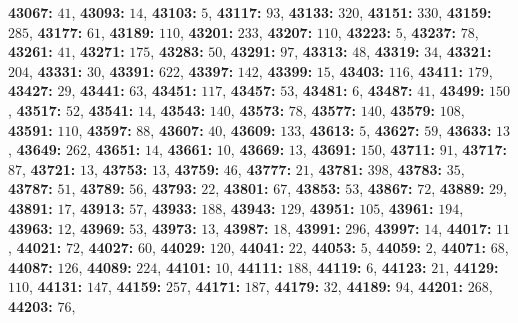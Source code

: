 \textsf{\bfseries 43067:} $41$, \textsf{\bfseries 43093:} $14$, \textsf{\bfseries 43103:} $5$, \textsf{\bfseries 43117:} $93$, \textsf{\bfseries 43133:} $320$, \textsf{\bfseries 43151:} $330$, \textsf{\bfseries 43159:} $285$, \textsf{\bfseries 43177:} $61$, \textsf{\bfseries 43189:} $110$, \textsf{\bfseries 43201:} $233$, \textsf{\bfseries 43207:} $110$, \textsf{\bfseries 43223:} $5$, \textsf{\bfseries 43237:} $78$, \textsf{\bfseries 43261:} $41$, \textsf{\bfseries 43271:} $175$, \textsf{\bfseries 43283:} $50$, \textsf{\bfseries 43291:} $97$, \textsf{\bfseries 43313:} $48$, \textsf{\bfseries 43319:} $34$, \textsf{\bfseries 43321:} $204$, \textsf{\bfseries 43331:} $30$, \textsf{\bfseries 43391:} $622$, \textsf{\bfseries 43397:} $142$, \textsf{\bfseries 43399:} $15$, \textsf{\bfseries 43403:} $116$, \textsf{\bfseries 43411:} $179$, \textsf{\bfseries 43427:} $29$, \textsf{\bfseries 43441:} $63$, \textsf{\bfseries 43451:} $117$, \textsf{\bfseries 43457:} $53$, \textsf{\bfseries 43481:} $6$, \textsf{\bfseries 43487:} $41$, \textsf{\bfseries 43499:} $150$, \textsf{\bfseries 43517:} $52$, \textsf{\bfseries 43541:} $14$, \textsf{\bfseries 43543:} $140$, \textsf{\bfseries 43573:} $78$, \textsf{\bfseries 43577:} $140$, \textsf{\bfseries 43579:} $108$, \textsf{\bfseries 43591:} $110$, \textsf{\bfseries 43597:} $88$, \textsf{\bfseries 43607:} $40$, \textsf{\bfseries 43609:} $133$, \textsf{\bfseries 43613:} $5$, \textsf{\bfseries 43627:} $59$, \textsf{\bfseries 43633:} $13$, \textsf{\bfseries 43649:} $262$, \textsf{\bfseries 43651:} $14$, \textsf{\bfseries 43661:} $10$, \textsf{\bfseries 43669:} $13$, \textsf{\bfseries 43691:} $150$, \textsf{\bfseries 43711:} $91$, \textsf{\bfseries 43717:} $87$, \textsf{\bfseries 43721:} $13$, \textsf{\bfseries 43753:} $13$, \textsf{\bfseries 43759:} $46$, \textsf{\bfseries 43777:} $21$, \textsf{\bfseries 43781:} $398$, \textsf{\bfseries 43783:} $35$, \textsf{\bfseries 43787:} $51$, \textsf{\bfseries 43789:} $56$, \textsf{\bfseries 43793:} $22$, \textsf{\bfseries 43801:} $67$, \textsf{\bfseries 43853:} $53$, \textsf{\bfseries 43867:} $72$, \textsf{\bfseries 43889:} $29$, \textsf{\bfseries 43891:} $17$, \textsf{\bfseries 43913:} $57$, \textsf{\bfseries 43933:} $188$, \textsf{\bfseries 43943:} $129$, \textsf{\bfseries 43951:} $105$, \textsf{\bfseries 43961:} $194$, \textsf{\bfseries 43963:} $12$, \textsf{\bfseries 43969:} $53$, \textsf{\bfseries 43973:} $13$, \textsf{\bfseries 43987:} $18$, \textsf{\bfseries 43991:} $296$, \textsf{\bfseries 43997:} $14$, \textsf{\bfseries 44017:} $11$, \textsf{\bfseries 44021:} $72$, \textsf{\bfseries 44027:} $60$, \textsf{\bfseries 44029:} $120$, \textsf{\bfseries 44041:} $22$, \textsf{\bfseries 44053:} $5$, \textsf{\bfseries 44059:} $2$, \textsf{\bfseries 44071:} $68$, \textsf{\bfseries 44087:} $126$, \textsf{\bfseries 44089:} $224$, \textsf{\bfseries 44101:} $10$, \textsf{\bfseries 44111:} $188$, \textsf{\bfseries 44119:} $6$, \textsf{\bfseries 44123:} $21$, \textsf{\bfseries 44129:} $110$, \textsf{\bfseries 44131:} $147$, \textsf{\bfseries 44159:} $257$, \textsf{\bfseries 44171:} $187$, \textsf{\bfseries 44179:} $32$, \textsf{\bfseries 44189:} $94$, \textsf{\bfseries 44201:} $268$, \textsf{\bfseries 44203:} $76$, 
